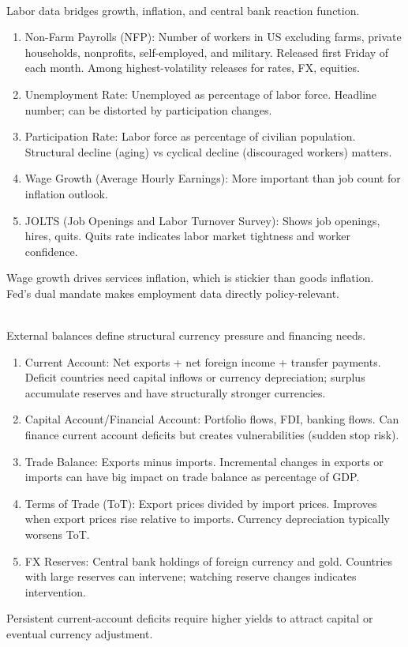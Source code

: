 \documentclass[a4paper,oneside,openany]{book}
\begin{document}
\begin{remark} \\
Labor data bridges growth, inflation, and central bank reaction function.
\begin{enumerate}[label=\roman*.]
\setlength{\itemsep}{0pt}
\item Non-Farm Payrolls (NFP): Number of workers in US excluding farms, private households, nonprofits, self-employed, and military. Released first Friday of each month. Among highest-volatility releases for rates, FX, equities.
\item Unemployment Rate: Unemployed as percentage of labor force. Headline number; can be distorted by participation changes.
\item Participation Rate: Labor force as percentage of civilian population. Structural decline (aging) vs cyclical decline (discouraged workers) matters.
\item Wage Growth (Average Hourly Earnings): More important than job count for inflation outlook. 
\item JOLTS (Job Openings and Labor Turnover Survey): Shows job openings, hires, quits. Quits rate indicates labor market tightness and worker confidence.
\end{enumerate}
Wage growth drives services inflation, which is stickier than goods inflation.\\
Fed's dual mandate makes employment data directly policy-relevant.
\end{remark}

\begin{remark} \\
External balances define structural currency pressure and financing needs.
\begin{enumerate}[label=\roman*.]
\setlength{\itemsep}{0pt}
\item Current Account: Net exports + net foreign income + transfer payments. Deficit countries need capital inflows or currency depreciation; surplus accumulate reserves and have structurally stronger currencies.
\item Capital Account/Financial Account: Portfolio flows, FDI, banking flows. Can finance current account deficits but creates vulnerabilities (sudden stop risk).
\item Trade Balance: Exports minus imports. Incremental changes in exports or imports can have big impact on trade balance as percentage of GDP.
\item Terms of Trade (ToT): Export prices divided by import prices. Improves when export prices rise relative to imports. Currency depreciation typically worsens ToT.
\item FX Reserves: Central bank holdings of foreign currency and gold. Countries with large reserves can intervene; watching reserve changes indicates intervention.
\end{enumerate}
Persistent current-account deficits require higher yields to attract capital or eventual currency adjustment.
\end{remark}
\end{document}
